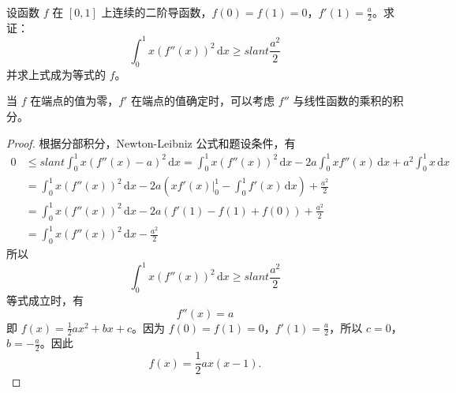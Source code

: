 \documentclass[../../main.tex]{subfiles}
\begin{document}
\begin{example}
设函数 \( f \) 在 \([0,1]\) 上连续的二阶导函数，\( f(0) = f(1) = 0 \)，\( f'(1) = \frac{a}{2} \)。求证：
\[
\int_{0}^{1} x(f''(x))^2 \, \mathrm{d}x \geqslant slant \frac{a^2}{2}
\]
并求上式成为等式的 \( f \)。
\end{example}
\begin{remark}
当 \( f \) 在端点的值为零，\( f' \) 在端点的值确定时，可以考虑 \( f'' \) 与线性函数的乘积的积分。
\end{remark}
\begin{proof}
根据分部积分，Newton-Leibniz 公式和题设条件，有
\begin{align*}
0 &\leqslant slant \int_{0}^{1} x(f''(x) - a)^2 \, \mathrm{d}x = \int_{0}^{1} x(f''(x))^2 \, \mathrm{d}x - 2a \int_{0}^{1} x f''(x) \, \mathrm{d}x + a^2 \int_{0}^{1} x \, \mathrm{d}x \\
&= \int_{0}^{1} x(f''(x))^2 \, \mathrm{d}x - 2a \left( x f'(x)\big|_{0}^{1} - \int_{0}^{1} f'(x) \, \mathrm{d}x \right) + \frac{a^2}{2} \\
&= \int_{0}^{1} x(f''(x))^2 \, \mathrm{d}x - 2a \left( f'(1) - f(1) + f(0) \right) + \frac{a^2}{2} \\
&= \int_{0}^{1} x(f''(x))^2 \, \mathrm{d}x - \frac{a^2}{2}
\end{align*}
所以
\[
\int_{0}^{1} x(f''(x))^2 \, \mathrm{d}x \geqslant slant \frac{a^2}{2}
\]
等式成立时，有
\[
f''(x) = a
\]
即 \( f(x) = \frac{1}{2} a x^2 + b x + c \)。因为 \( f(0) = f(1) = 0 \)，\( f'(1) = \frac{a}{2} \)，所以 \( c = 0 \)，\( b = -\frac{a}{2} \)。因此
\[
f(x) = \frac{1}{2} a x(x - 1).
\]
\end{proof}
\end{document}
